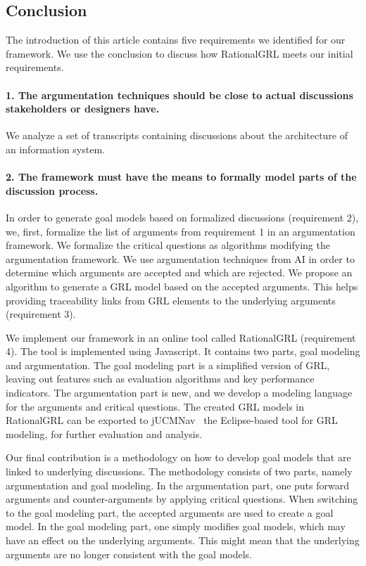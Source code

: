 \subsection{Conclusion}


The introduction of this article contains five requirements we identified for our framework. We use the conclusion to discuss how RationalGRL meets our initial requirements.

\paragraph{1. The argumentation techniques should be close to actual discussions stakeholders or designers have.}

We analyze a set of transcripts containing discussions about the architecture of an information system. 

\paragraph{2. The framework must have the means to formally model parts of the discussion process.}
In order to generate goal models based on formalized discussions (requirement 2), we, first, formalize the list of arguments from requirement 1 in an argumentation framework. We formalize the critical questions as algorithms modifying the argumentation framework. We use argumentation techniques from AI in order to determine which arguments are accepted and which are rejected. We propose an algorithm to generate a GRL model based on the accepted arguments. This helps providing traceability links from GRL elements to the underlying arguments (requirement 3).

We implement our framework in an online tool called RationalGRL (requirement 4). The tool is implemented using Javascript. It contains  two parts, goal modeling and argumentation. The goal modeling part is a simplified version of GRL, leaving out features such as evaluation algorithms and key performance indicators. The argumentation part is new, and we develop a modeling language for the arguments and critical questions. The created GRL models in RationalGRL can be exported to jUCMNav~\cite{} %
 the Eclipse-based tool for GRL modeling, for further evaluation and analysis. 

Our final contribution is a methodology on how to develop goal models that are linked to underlying discussions. The methodology consists of two parts, namely argumentation and goal modeling. In the argumentation part, one puts forward arguments and counter-arguments by applying critical questions. When switching to the goal modeling part, the accepted arguments are used to create a goal model. In the goal modeling part, one simply modifies goal models, which may have an effect on the underlying arguments. This might mean that the underlying arguments are no longer consistent with the goal models.